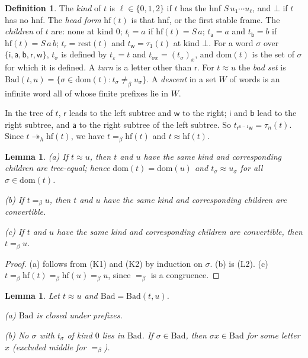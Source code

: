 \documentclass[11pt]{amsart}
\newtheorem{lemma}[theorem]{Lemma}
\theoremstyle{definition}
\newtheorem{definition}[theorem]{Definition}
\newcommand{\hred}{\twoheadrightarrow_h}
\newcommand{\conv}{=_\beta}
\newcommand{\nconv}{\neq_\beta}
\newcommand{\rest}{\mathrm{rest}}
\newcommand{\Hd}{\mathrm{hf}}
\newcommand{\dom}{\mathrm{dom}}
\newcommand{\Bad}{\mathrm{Bad}}
\newcommand{\li}{\mathsf i}
\newcommand{\la}{\mathsf a}
\newcommand{\lb}{\mathsf b}
\newcommand{\lr}{\mathsf r}
\newcommand{\lw}{\mathsf w}
\begin{document}
\begin{definition}\label{def:descent}
The \emph{kind} of $t$ is $\ell\in\{0,1,2\}$ if $t$ has the hnf $S\,u_1\cdots u_\ell$, and $\bot$ if $t$
has no hnf. The \emph{head form} $\Hd(t)$ is that hnf, or the first stable frame. The \emph{children}
of $t$ are: none at kind $0$; $t_\li=a$ if $\Hd(t)=S\,a$; $t_\la=a$ and $t_\lb=b$ if $\Hd(t)=S\,a\,b$;
$t_\lr=\rest(t)$ and $t_\lw=\tau_1(t)$ at kind $\bot$. For a word $\sigma$ over
$\{\li,\la,\lb,\lr,\lw\}$, $t_\sigma$ is defined by $t_\varepsilon=t$ and $t_{\sigma x}=(t_\sigma)_x$, and
$\dom(t)$ is the set of $\sigma$ for which it is defined. A \emph{turn} is a letter other than $\lr$.
For $t\approx u$ the \emph{bad set} is $\Bad(t,u)=\{\sigma\in\dom(t):t_\sigma\nconv u_\sigma\}$. A
\emph{descent} in a set $W$ of words is an infinite word all of whose finite prefixes lie in $W$.
\end{definition}

In the tree of $t$, $\lr$ leads to the left subtree and $\lw$ to the right; $\li$ and $\lb$ lead to
the right subtree, and $\la$ to the right subtree of the left subtree. So $t_{\lr^{n-1}\lw}=\tau_n(t)$.
Since $t\hred\Hd(t)$, we have $t\conv\Hd(t)$ and $t\approx\Hd(t)$.

\begin{lemma}\label{lem:kids}
\textup{(a)} If $t\approx u$, then $t$ and $u$ have the same kind and corresponding children are
tree-equal; hence $\dom(t)=\dom(u)$ and $t_\sigma\approx u_\sigma$ for all $\sigma\in\dom(t)$.

\textup{(b)} If $t\conv u$, then $t$ and $u$ have the same kind and corresponding children are
convertible.

\textup{(c)} If $t$ and $u$ have the same kind and corresponding children are convertible, then
$t\conv u$.
\end{lemma}

\begin{proof}
(a) follows from (K1) and (K2) by induction on $\sigma$. (b) is (L2). (c)
$t\conv\Hd(t)\conv\Hd(u)\conv u$, since $\conv$ is a congruence.
\end{proof}

\begin{lemma}\label{lem:bad}
Let $t\approx u$ and $\Bad=\Bad(t,u)$.

\textup{(a)} $\Bad$ is closed under prefixes.

\textup{(b)} No $\sigma$ with $t_\sigma$ of kind $0$ lies in $\Bad$. If $\sigma\in\Bad$, then
$\sigma x\in\Bad$ for some letter $x$ (excluded middle for $\conv$).
\end{lemma}
\end{document}

